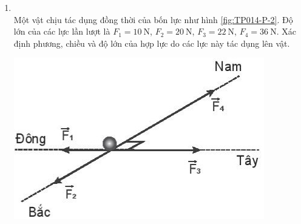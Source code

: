 \begin{enumerate}[label=\bfseries Bài \arabic*:,leftmargin=1.5cm]
\item{}\\
Một vật chịu tác dụng đồng thời của bốn lực như hình \ref{fig:TP014-P-2}. Độ lớn của các lực lần lượt là $F_1=\SI{10}{\newton}$, $F_2=\SI{20}{\newton}$, $F_3=\SI{22}{\newton}$, $F_4=\SI{36}{\newton}$. Xác định phương, chiều và độ lớn của hợp lực do các lực này tác dụng lên vật.
\begin{center}
	\includegraphics[width=0.35\linewidth]{../figs/VN10-2023-PH-TP014-P-2}
	\label{fig:TP014-P-2}
\end{center}


\end{enumerate}
